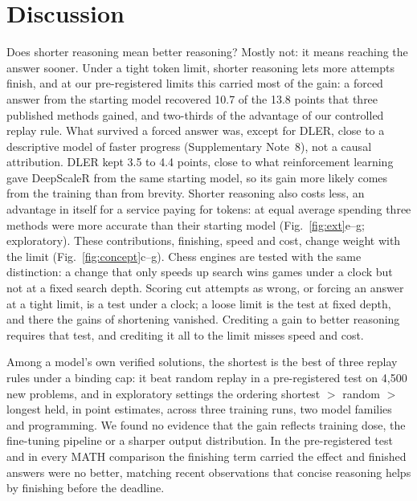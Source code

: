 \documentclass[10pt]{article}
\begin{document}
\section{Discussion}
Does shorter reasoning mean better reasoning? Mostly not: it means reaching the answer sooner. Under a tight token limit, shorter reasoning lets more attempts finish, and at our pre-registered limits this carried most of the gain: a forced answer from the starting model recovered 10.7 of the 13.8 points that three published methods gained, and two-thirds of the advantage of our controlled replay rule. What survived a forced answer was, except for DLER, close to a descriptive model of faster progress (Supplementary Note~8), not a causal attribution. DLER kept 3.5 to 4.4 points, close to what reinforcement learning gave DeepScaleR from the same starting model, so its gain more likely comes from the training than from brevity. Shorter reasoning also costs less, an advantage in itself for a service paying for tokens: at equal average spending three methods were more accurate than their starting model (Fig.~\ref{fig:ext}e--g; exploratory). These contributions, finishing, speed and cost, change weight with the limit (Fig.~\ref{fig:concept}c--g). Chess engines are tested with the same distinction: a change that only speeds up search wins games under a clock but not at a fixed search depth. Scoring cut attempts as wrong, or forcing an answer at a tight limit, is a test under a clock; a loose limit is the test at fixed depth, and there the gains of shortening vanished. Crediting a gain to better reasoning requires that test, and crediting it all to the limit misses speed and cost.

Among a model's own verified solutions, the shortest is the best of three replay rules under a binding cap: it beat random replay in a pre-registered test on 4{,}500 new problems, and in exploratory settings the ordering shortest $>$ random $>$ longest held, in point estimates, across three training runs, two model families and programming. We found no evidence that the gain reflects training dose, the fine-tuning pipeline or a sharper output distribution. In the pre-registered test and in every MATH comparison the finishing term carried the effect and finished answers were no better, matching recent observations that concise reasoning helps by finishing before the deadline\cite{carlon2026shorter}.
\end{document}
